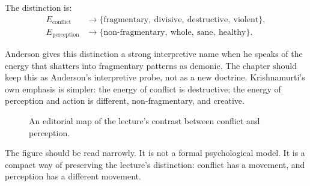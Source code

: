 The distinction is:
\begin{align}
E_{\mathrm{conflict}}
   &\longrightarrow
   \{\text{fragmentary},\ \text{divisive},\ \text{destructive},\ \text{violent}\},\\
E_{\mathrm{perception}}
   &\longrightarrow
   \{\text{non-fragmentary},\ \text{whole},\ \text{sane},\ \text{healthy}\}.
\end{align}

Anderson gives this distinction a strong interpretive name when he speaks of the energy that shatters into fragmentary patterns as demonic. The chapter should keep this as Anderson's interpretive probe, not as a new doctrine. Krishnamurti's own emphasis is simpler: the energy of conflict is destructive; the energy of perception and action is different, non-fragmentary, and creative.

\begin{figure}
\centering
{}
\caption{An editorial map of the lecture's contrast between conflict and perception.}
\end{figure}

The figure should be read narrowly. It is not a formal psychological model. It is a compact way of preserving the lecture's distinction: conflict has a movement, and perception has a different movement.

